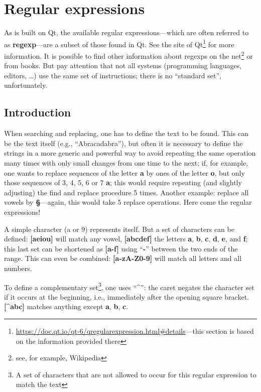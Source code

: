 
\chapter{Regular expressions}
\label{sec:regexp}

As {\Tw} is built on Qt, the available regular expressions---which are often referred to as \textbf{regexp}---are a subset of those found in Qt. See the site of Qt\footnote{\label{fn.regexpQt}\url{https://doc.qt.io/qt-6/qregularexpression.html#details}---this section is based on the information provided there} for more information. It is possible to find other information about regexps on the net\footnote{see, for example, Wikipedia} or from books. But pay attention that not all systems (programming languages, editors, \dots) use the same set of instructions; there is no ``standard set'', unfortunately.

\section{Introduction}

When searching and replacing, one has to define the text to be found. This can be the text itself (e.g., ``Abracadabra''), but often it is necessary to define the strings in a more generic and powerful way to avoid repeating the same operation many times with only small changes from one time to the next; if, for example, one wants to replace sequences of the letter \textbf{a} by ones of the letter \textbf{o}, but only those sequences of 3, 4, 5, 6 or 7 \textbf{a}; this would require repeating (and slightly adjusting) the find and replace procedure 5 times. Another example: replace all vowels by \textbf{§}---again, this would take 5 replace operations. Here come the regular expressions!

A simple character (a or 9) represents itself. But a set of characters can be defined: \textbf{[aeiou]} will match any vowel, \textbf{[abcdef]} the letters \textbf{a}, \textbf{b}, \textbf{c}, \textbf{d}, \textbf{e}, and \textbf{f}; this last set can be shortened as \textbf{[a-f]} using ``\textbf{-}'' between the two ends of the range. This can even be combined: \textbf{[a-zA-Z0-9]} will match all letters and all numbers.

To define a complementary set\footnote{A set of characters that are not allowed to occur for this regular expression to match the text}, one uses ``\textbf{\^{}}'': the caret negates the character set if it occurs at the beginning, i.e., immediately after the opening square bracket. \textbf{[\^{}abc]} matches anything except \textbf{a}, \textbf{b}, \textbf{c}.

